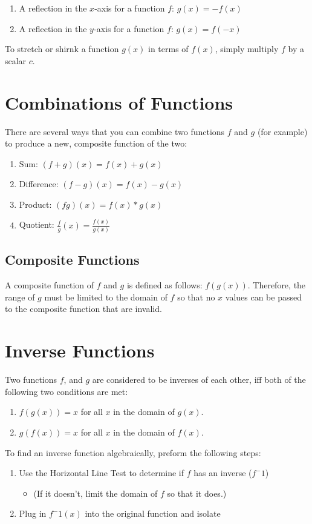 \begin{enumerate}
\item A reflection in the $x$-axis for a function $f$: $g(x)=-f(x)$
\item A reflection in the $y$-axis for a function $f$: $g(x)=f(-x)$
\end{enumerate}

To stretch or shirnk a function $g(x)$ in terms of $f(x)$, simply multiply $f$
by a scalar $c$.

\section{Combinations of Functions}
There are several ways that you can combine two functions $f$ and $g$ (for
example) to produce a new, composite function of the two:

\begin{enumerate}
\item Sum: $(f+g)(x)=f(x)+g(x)$
\item Difference: $(f-g)(x)=f(x)-g(x)$
\item Product: $(fg)(x)=f(x)*g(x)$
\item Quotient: $\frac{f}{g}(x)=\frac{f(x)}{g(x)}$
\end{enumerate}

\subsection{Composite Functions}
A composite function of $f$ and $g$ is defined as follows: $f(g(x))$.
Therefore, the range of $g$ must be limited to the domain of $f$ so that no $x$
values can be passed to the composite function that are invalid.

\section{Inverse Functions}
Two functions $f$, and $g$ are considered to be inverses of each other, iff both
of the following two conditions are met:

\begin{enumerate}
\item $f(g(x))=x$ for all $x$ in the domain of $g(x)$.
\item $g(f(x))=x$ for all $x$ in the domain of $f(x)$.
\end{enumerate}

To find an inverse function algebraically, preform the following steps:

\begin{enumerate}
\item Use the Horizontal Line Test to determine if $f$ has an inverse ($f^-1$)
  \begin{itemize}
  \item (If it doesn't, limit the domain of $f$ so that it does.)
  \end{itemize}
\item{Plug in $f^-1(x)$ into the original function and isolate}
\end{enumerate}
